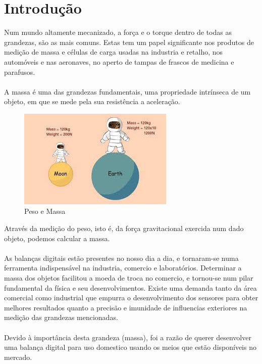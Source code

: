 \chapter{Introdução}
Num mundo altamente mecanizado, a força e o torque dentro de todas as grandezas, são as mais comuns. Estas tem um papel significante nos produtos de medição de massa e células de carga usadas na industria e retalho, nos automóveis e nas aeronaves, no aperto de tampas de frascos de medicina e parafusos.\cite{book-9}\\
\\
A massa é uma das grandezas fundamentais, uma propriedade intrínseca de um objeto, em que se mede pela sua resistência a aceleração.\cite{book-2}
\begin{figure}[H]
	\centering
	\includegraphics[width=\linewidth]{./image/PESTA/fisica/mass.jpg}
	\caption{Peso e Massa}
	\label{mass}
\end{figure}
Através da medição do peso, isto é, da força gravitacional exercida num dado objeto, podemos calcular a massa. \cite{book-2}\\
\\
As balanças digitais estão presentes no nosso dia a dia, e tornaram-se numa ferramenta indispensável na industria, comercio e laboratórios. Determinar a massa dos objetos facilitou a moeda de troca no comercio, e tornou-se num pilar fundamental da física e seu desenvolvimentos. Existe uma demanda tanto da área comercial como industrial que empurra o desenvolvimento dos sensores para obter melhores resultados quanto a precisão e imunidade de influencias exteriores na medição das grandezas mencionadas.\\
\\
Devido à importância desta grandeza (massa), foi a razão de querer desenvolver uma balança digital para uso domestico usando os meios que estão disponíveis no mercado.
\newpage
